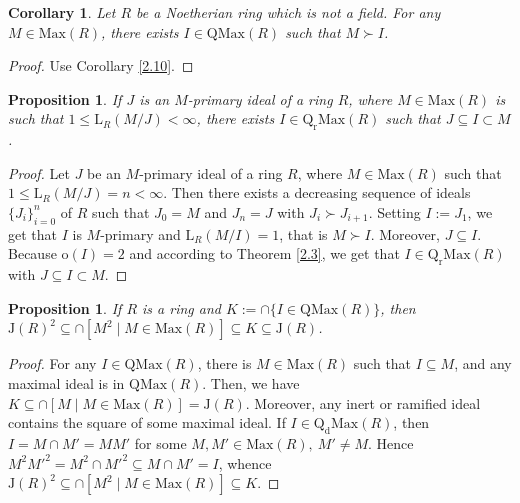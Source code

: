 \documentclass[12pt,leqno]{amsart}
\newtheorem{proposition}[theorem]{Proposition}
\newtheorem{corollary}[theorem]{Corollary}
\theoremstyle{definition}
\begin{document}
\begin{corollary}\label{2.20} Let $R$ be a Noetherian ring which is not a field. For any $M\in\mathrm{Max}(R)$, there exists $I\in\mathrm{QMax}(R)$ such that $M\succ I$.
 \end{corollary}
\begin{proof} Use Corollary \ref{2.10}. 
\end{proof}

\begin{proposition}\label{2.12} If $J$ is an $M$-primary ideal of a ring $R$, where $M\in\mathrm{Max}(R)$ is such that $1\leq\mathrm{L}_R(M/J)<\infty$, there exists $I\in\mathrm{Q_rMax}(R)$ such that $J\subseteq I\subset M$. 
\end{proposition}
\begin{proof} Let $J$ be an $M$-primary ideal of a ring $R$, where $M\in\mathrm{Max}(R)$ such that $1\leq\mathrm{L}_R(M/J)=n<\infty$. Then there exists a decreasing sequence of ideals $\{J_i\}_{i=0}^n$ of $R$ such that $J_0=M$ and $J_n=J$ with $J_i\succ J_{i+1}$. Setting $I:=J_1$, we get that $I$ is $M$-primary and $\mathrm{L}_R(M/I)=1$, that is $M\succ I$. Moreover, $J\subseteq I$. Because $\mathrm o(I)=2$ and according to Theorem \ref{2.3}, we get that $I\in\mathrm{Q_rMax}(R)$ with $J\subseteq  I\subset M$.
\end{proof}

\begin{proposition}\label{2.11} If $R$ is a ring and $K:=\cap\{I\in\mathrm {QMax}(R)\}$, then $\mathrm J(R)^2\subseteq\cap[M^2\mid M\in\mathrm{Max}(R)]\subseteq K\subseteq\mathrm J(R)$.
\end{proposition}
\begin{proof} For any $I\in\mathrm{QMax}(R)$, there is $M\in\mathrm {Max}(R)$ such that $I\subseteq M$, and any maximal ideal is in $\mathrm {QMax}(R)$. Then, we have $K\subseteq\cap[M\mid M\in\mathrm{Max}(R)] =\mathrm J(R)$. Moreover, any inert or ramified ideal contains the square of some maximal ideal. If $I\in\mathrm{Q_dMax}(R)$, then $I=M\cap M'=M M'$ for some $M,M'\in\mathrm{Max}(R),\ M'\neq M$. Hence $M^2M'^2=M^ 2\cap M'^2\subseteq M\cap M'=I$, whence $\mathrm J(R)^2\subseteq\cap[M^2\mid M\in\mathrm {Max}(R)]\subseteq K$.
\end{proof}
\end{document}
